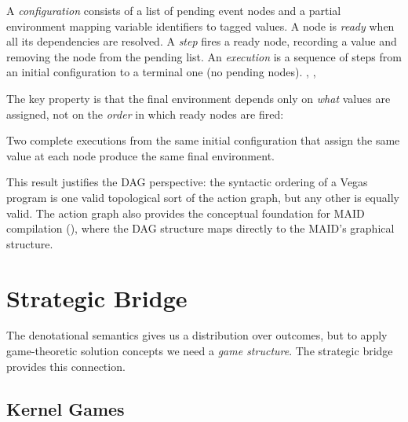 \documentclass[11pt]{article}
\begin{document}
\begin{definition}
A \emph{configuration} consists of a list of pending event nodes and a partial
environment mapping variable identifiers to tagged values. A node is
\emph{ready} when all its dependencies are resolved. A \emph{step} fires a
ready node, recording a value and removing the node from the pending list. An
\emph{execution} is a sequence of steps from an initial configuration to a
terminal one (no pending nodes).
, , 
\end{definition}

The key property is that the final environment depends only on \emph{what}
values are assigned, not on the \emph{order} in which ready nodes are fired:

\begin{theorem}\label{thm:execunique}
Two complete executions from the same initial configuration that assign the
same value at each node produce the same final environment.

\noindent{}
\end{theorem}

\noindent
This result justifies the DAG perspective: the syntactic ordering of a Vegas
program is one valid topological sort of the action graph, but any other is
equally valid. The action graph also provides the conceptual foundation for
MAID compilation (), where the DAG structure maps directly to
the MAID's graphical structure.


\section{Strategic Bridge}\label{sec:strategic}

The denotational semantics gives us a distribution over outcomes, but to apply
game-theoretic solution concepts we need a \emph{game structure}. The
strategic bridge provides this connection.

\subsection{Kernel Games}\label{sec:kernelgame}
\end{document}
